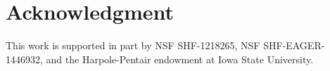\documentclass[conference]{IEEEtran}
\begin{document}
\section*{Acknowledgment}
This work is supported in part by NSF SHF-1218265, NSF SHF-EAGER-1446932, and the Harpole-Pentair endowment at Iowa State University.






\balance


\end{document}

